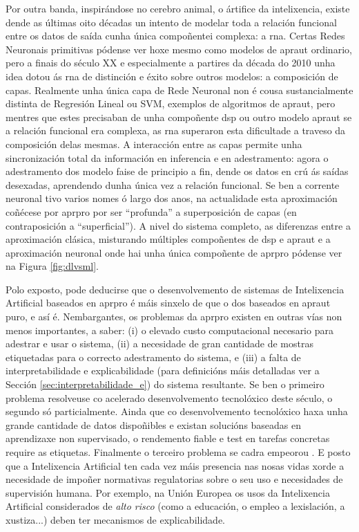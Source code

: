 Por outra banda, inspirándose no cerebro animal, o ártifice da intelixencia, existe dende as últimas oito décadas un intento de modelar toda a relación funcional entre os datos de saída cunha única compoñentei complexa: a \acrfull{rna}. Certas Redes Neuronais primitivas pódense ver hoxe mesmo como modelos de \acrshort{apraut} ordinario, pero a finais do século XX e especialmente a partires da década do 2010 unha idea dotou ás \acrshort{rna} de distinción e éxito sobre outros modelos: a composición de capas. Realmente unha única capa de Rede Neuronal non é cousa sustancialmente distinta de Regresión Lineal ou SVM, exemplos de algoritmos de \acrshort{apraut}, pero mentres que estes precisaban de unha compoñente \acrshort{dsp} ou outro modelo \acrshort{apraut} se a relación funcional era complexa, as \acrshort{rna} superaron esta dificultade a traveso da composición delas mesmas. A interacción entre as capas permite unha sincronización total da información en inferencia e en adestramento: agora o adestramento dos modelo faise de principio a fin, dende os datos en crú ás saídas desexadas, aprendendo dunha única vez a relación funcional. Se ben a corrente neuronal tivo varios nomes ó largo dos anos, na actualidade esta aproximación coñécese por \acrfull{aprpro} por ser ``profunda'' a superposición de capas (en contraposición a ``superficial''). A nivel do sistema completo, as diferenzas entre a aproximación clásica, misturando múltiples compoñentes de \acrshort{dsp} e \acrshort{apraut} e a aproximación neuronal onde hai unha única compoñente de \acrshort{aprpro} pódense ver na Figura \ref{fig:dlvsml}.

Polo exposto, pode deducirse que o desenvolvemento de sistemas de Intelixencia Artificial baseados en \acrshort{aprpro} é máis sinxelo de que o dos baseados en \acrshort{apraut} puro, e así é. Nembargantes, os problemas da \acrshort{aprpro} existen en outras vías non menos importantes, a saber: (i) o elevado custo computacional necesario para adestrar e usar o sistema, (ii) a necesidade de gran cantidade de  mostras etiquetadas para o correcto adestramento do sistema, e (iii) a falta de  \gls{interpretabilidade} e \gls{explicabilidade} (para definicións máis detalladas ver a Sección \ref{sec:interpretabilidade_e}) do sistema resultante. Se ben o primeiro problema resolveuse co acelerado desenvolvemento tecnolóxico deste século, o segundo só particialmente. Ainda que co desenvolvemento tecnolóxico haxa unha grande cantidade de datos dispoñibles e existan solucións baseadas en aprendizaxe non supervisado, o rendemento fiable e test en tarefas concretas require as etiquetas. Finalmente o terceiro problema se cadra empeorou \cite{escalar_malo}. E posto que a Intelixencia Artificial ten cada vez máis presencia nas nosas vidas xorde a necesidade de impoñer normativas regulatorias sobre o seu uso e necesidades de supervisión humana. Por exemplo, na Unión Europea os usos da Intelixencia Artificial considerados de \emph{alto risco} (como a educación, o empleo a lexislación, a xustiza...) deben ter mecanismos de \gls{explicabilidade}\cite{ai_act}.

